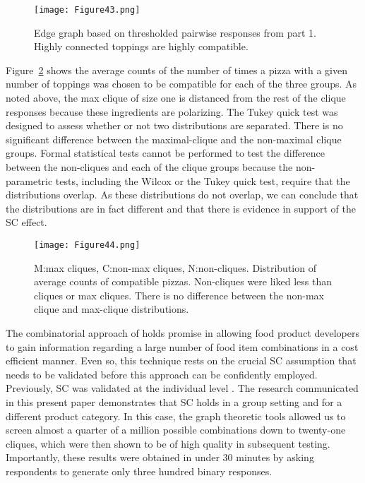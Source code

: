 \begin{figure}[h!]
\caption[Edge graph based on thresholded pairwise responses from part 1]{Edge graph based on thresholded pairwise responses from part 1.  Highly connected toppings are highly compatible.}
\label{fig:pizzedge}
\centering
\texttt{[image: Figure43.png]}
\end{figure}

Figure~\ref{fig:pizzdist} shows the average counts of the number of times a pizza with a given number of toppings was chosen to be compatible for each of the three groups.  As noted above, the max clique of size one is distanced from the rest of the clique responses because these ingredients are polarizing.  The Tukey quick test was designed to assess whether or not two distributions are separated.  There is no significant difference between the maximal-clique and the non-maximal clique groups.  Formal statistical tests cannot be performed to test the difference between the non-cliques and each of the clique groups because the non-parametric tests, including the Wilcox or the Tukey quick test, require that the distributions overlap.  As these distributions do not overlap, we can conclude that the distributions are in fact different and that there is evidence in support of the SC effect.  

\begin{figure}[h!]
\caption[Distribution of average counts of compatible pizzas.]{M:max cliques, C:non-max cliques, N:non-cliques.  Distribution of average counts of compatible pizzas.  Non-cliques were liked less than cliques or max cliques.  There is no difference between the non-max clique and max-clique distributions.}
\label{fig:pizzdist}
\centering
\texttt{[image: Figure44.png]}
\end{figure}

The combinatorial approach of \citet{Ennis2010} holds promise in allowing food product developers to gain information regarding a large number of food item combinations in a cost efficient manner.  Even so, this technique rests on the crucial SC assumption that needs to be validated before this approach can be confidently employed.  Previously, SC was validated at the individual level \citep{Nestrud2010a}. The research communicated in this present paper demonstrates that SC holds in a group setting and for a different product category.  In this case, the graph theoretic tools allowed us to screen almost a quarter of a million possible combinations down to twenty-one cliques, which were then shown to be of high quality in subsequent testing.  Importantly, these results were obtained in under 30 minutes by asking respondents to generate only three hundred binary responses. 

